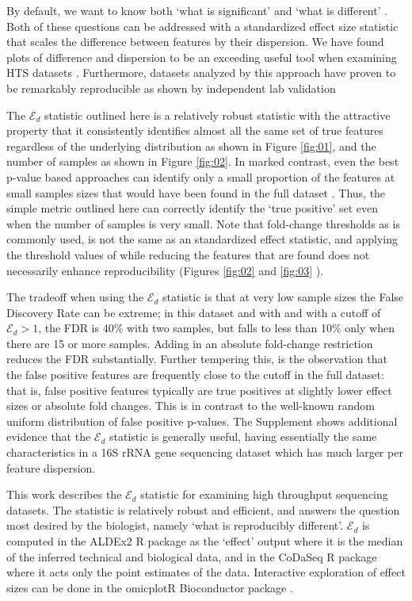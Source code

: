 By default, we want to know both `what is significant' and `what is different' \citep{Cui:2003aa}.  Both of these questions can be addressed with a standardized effect size statistic that scales the difference between features by their dispersion. We have found plots of difference and dispersion to be an exceeding useful tool when examining HTS datasets \citep{gloor:effect}. Furthermore, datasets analyzed by this approach have proven to be remarkably reproducible as shown by independent lab validation \citep{macklaim:2013, nelson:2015vaginal}

The $\mathcal{E}_{d}$ statistic outlined here is a relatively robust statistic with the attractive property that it consistently  identifies almost all the same set of true features regardless of the underlying distribution as shown in Figure \ref{fig:01}, and the number of samples as shown in Figure \ref{fig:02}. In marked contrast, even the best p-value based  approaches can identify only a small proportion of the features at small samples sizes that would have been found in the full dataset \citep{Schurch:2016aa}. Thus, the simple metric outlined here  can correctly identify the `true positive' set even when the number of samples is very small. Note that fold-change thresholds as is commonly used, is not the same as an standardized effect statistic, and applying the threshold values of \citep{Schurch:2016aa} while reducing the features that are found does not necessarily enhance reproducibility (Figures \ref{fig:02} and \ref{fig:03} ). 

The tradeoff when using the $\mathcal{E}_{d}$ statistic is that at very low sample sizes the False Discovery Rate can be extreme; in this dataset and with and with a cutoff of $\mathcal{E}_{d} > 1$, the FDR is 40\% with two samples, but falls to less than 10\% only when there are 15 or more samples. Adding in an absolute fold-change restriction reduces the FDR substantially. Further tempering this, is the observation that the false positive features are frequently  close to the cutoff in the full dataset: that is, false positive features typically are true positives at slightly lower effect sizes or absolute fold changes. This is in contrast to the well-known random uniform distribution of false positive p-values. The Supplement shows additional evidence that the  $\mathcal{E}_{d}$ statistic is generally useful, having essentially the same characteristics in a 16S rRNA gene sequencing dataset which has much larger per feature dispersion. 

This work  describes the  $\mathcal{E}_{d}$ statistic for examining high throughput sequencing datasets. The statistic is relatively robust and efficient, and answers the question most desired by the biologist, namely `what is reproducibly different'.   $\mathcal{E}_{d}$ is computed in the ALDEx2 R package as the `effect' output where it is the median of the inferred technical and biological data, and in the CoDaSeq R package where it acts only the point estimates of the data. Interactive exploration of effect sizes can be done in the omicplotR Bioconductor package \citep{omicplot}.
